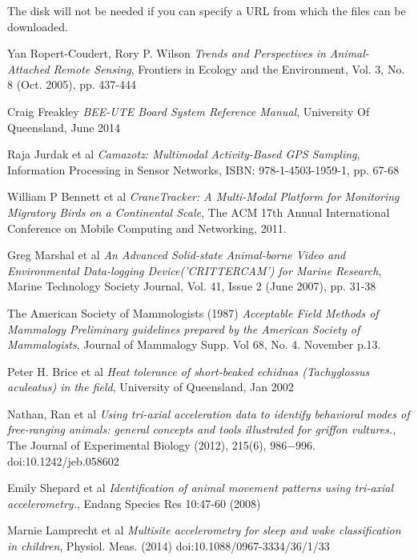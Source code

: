 \documentclass[12pt,openany,a4paper]{book}
\begin{document}
The disk will not be needed if you can specify a URL from which the
files can be downloaded.

\cleardoublepage


\begin{thebibliography}{99}
	Yan Ropert-Coudert, Rory P. Wilson
	\emph{Trends and Perspectives in Animal-Attached Remote Sensing},
	Frontiers in Ecology and the Environment,
	Vol. 3, No. 8 (Oct. 2005), pp. 437-444
	
	Craig Freakley
	\emph{BEE-UTE Board System Reference Manual},
	University Of Queensland, June 2014
	
	Raja Jurdak et al
	\emph{Camazotz: Multimodal Activity-Based GPS Sampling},
	Information Processing in Sensor Networks,
	ISBN: 978-1-4503-1959-1, pp. 67-68
	
	William P Bennett et al
	\emph{CraneTracker: A Multi-Modal Platform for Monitoring Migratory Birds on a Continental Scale},
	The ACM 17th Annual International Conference on Mobile Computing and Networking, 2011.
	
	Greg Marshal et al
	\emph{An Advanced Solid-state Animal-borne Video and Environmental Data-logging Device('CRITTERCAM') for Marine Research},
	Marine Technology Society Journal,
	Vol. 41, Issue 2 (June 2007), pp. 31-38
	
	The American Society of Mammologists (1987) \emph{Acceptable Field Methods of Mammalogy Preliminary guidelines prepared by the American Society of Mammalogists},
	Journal of Mammalogy Supp. Vol 68, No. 4. November p.13.
	
	Peter H. Brice et al
	\emph{Heat tolerance of short-beaked echidnas (Tachyglossus aculeatus) in the field},
	University of Queensland, Jan 2002
	
	Nathan, Ran et al
	\emph{Using tri-axial acceleration data to identify behavioral modes of free-ranging animals: general concepts and tools illustrated for griffon vultures.},
	The Journal of Experimental Biology (2012), 215(6), 986$-$996. doi:10.1242/jeb.058602
	
	Emily Shepard et al
	\emph{Identification of animal movement patterns using tri-axial accelerometry.},
	Endang Species Res 10:47-60 (2008)
	
	Marnie Lamprecht et al
	\emph{Multisite accelerometry for sleep and wake classification in children},
	Physiol. Meas. (2014) doi:10.1088/0967-3334/36/1/33
	

\end{thebibliography}
\end{document}
